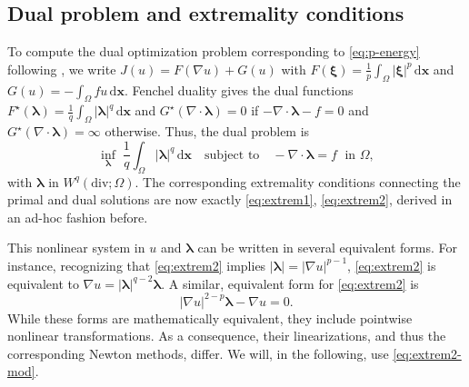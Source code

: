 \documentclass[11pt,pdflatex,sn-mathphys-num]{sn-jnl}
\theoremstyle{thmstyleone}%
\theoremstyle{thmstyletwo}%
\theoremstyle{thmstylethree}%
\newcommand{\bs}[1]{\ensuremath{\boldsymbol{#1}}}
\begin{document}
\subsection{Dual problem and extremality conditions}\label{sec:duality}
To compute the dual optimization problem corresponding to \eqref{eq:p-energy} following \cite{EkelandTemam99}, we write $J(u) = F(\nabla u) + G(u)$ with $F(\bs\xi) = \tfrac{1}{p}\int_\Omega|\bs\xi|^p\,\mathrm{d}\bs x$ and $G(u) = -\int_\Omega f u\,\mathrm{d}\bs x$. Fenchel duality gives the dual functions
$F^\star(\bs\lambda) = \frac{1}{q}\int_\Omega |\bs\lambda|^q\,\mathrm{d}\bs x$ and $G^\star(\nabla \cdot \bs\lambda)=0$ if $-\nabla\cdot\bs\lambda - f=0$ and $G^\star(\nabla \cdot \bs\lambda)=\infty$ otherwise. Thus, the dual problem is
\begin{equation*}
\inf_{\bs \lambda}\;\frac{1}{q}\int_\Omega|\bs\lambda|^q\,\mathrm{d}\bs x \quad\text{subject to}\quad -\nabla\!\cdot\!\bs\lambda = f \;\text{ in }\Omega,
\end{equation*}
with $\bs\lambda$ in $W^{q}(\mathrm{div};\Omega)$.
The corresponding extremality conditions connecting the primal and dual solutions are now exactly \eqref{eq:extrem1}, \eqref{eq:extrem2}, derived in an ad-hoc fashion before.



This nonlinear system in $u$ and $\bs \lambda$ can be written in several equivalent forms. For instance, recognizing that \eqref{eq:extrem2} implies $|\bs \lambda| = |\nabla u|^{p-1}$, \eqref{eq:extrem2} is equivalent to
$\nabla u = |\bs\lambda|^{q-2}\bs\lambda$.
A similar, equivalent form for \eqref{eq:extrem2} is
\begin{equation}\label{eq:extrem2-mod}
|\nabla u|^{2-p}\bs\lambda - \nabla u = 0.    
\end{equation}
While these forms are mathematically equivalent, they include pointwise nonlinear transformations. As a consequence, their linearizations, and thus the corresponding Newton methods, differ. We will, in the following, use \eqref{eq:extrem2-mod}.
\end{document}

